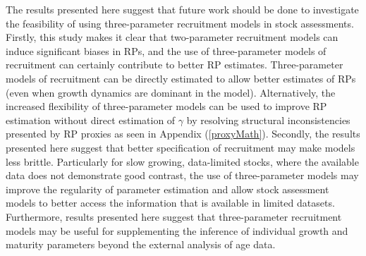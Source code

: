 %
The results presented here suggest that future work should be done
to investigate the feasibility of using three-parameter recruitment models in 
stock assessments. 
%
Firstly, this study makes it clear that two-parameter recruitment models can 
induce significant biases in RPs, and the use of three-parameter models of 
recruitment can certainly contribute to better RP estimates.
Three-parameter models of recruitment can be directly estimated to allow better estimates 
of RPs (even when growth dynamics are dominant in the model). Alternatively, 
the increased flexibility of three-parameter models can be used to improve RP estimation 
without direct estimation of $\gamma$ by resolving structural inconsistencies presented by RP 
proxies as seen in Appendix (\ref{proxyMath}).
Secondly, the results presented here suggest that better specification of 
recruitment may make models less brittle. Particularly for slow growing, 
data-limited stocks, where the available data does not demonstrate good contrast, 
the use of three-parameter models may improve the regularity of parameter 
estimation and allow stock assessment models to better access the information 
that is available in limited datasets. %
Furthermore, results presented here suggest that three-parameter recruitment models %
may be useful for supplementing the inference of individual growth and maturity 
parameters beyond the external analysis of age data. 




